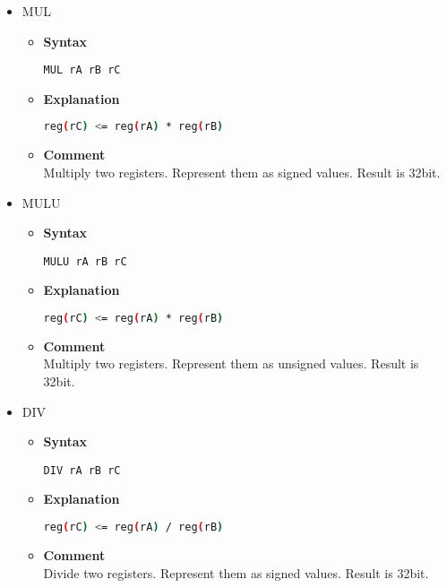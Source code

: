 \begin{itemize}
    \item MUL
    \begin{itemize}
        \item \textbf{Syntax}
        \begin{lstlisting}[language={[markII]Assembler}, frame=single]
    MUL rA rB rC
        \end{lstlisting}
        \item \textbf{Explanation}
        \begin{lstlisting}[language=bash, frame=single]
    reg(rC) <= reg(rA) * reg(rB)
        \end{lstlisting}
        \item \textbf{Comment} \\
        Multiply two registers. Represent them as signed values. Result is 32bit.
    \end{itemize}

    \item MULU
    \begin{itemize}
        \item \textbf{Syntax}
        \begin{lstlisting}[language={[markII]Assembler}, frame=single]
    MULU rA rB rC
        \end{lstlisting}
        \item \textbf{Explanation}
        \begin{lstlisting}[language=bash, frame=single]
    reg(rC) <= reg(rA) * reg(rB)
        \end{lstlisting}
        \item \textbf{Comment} \\
        Multiply two registers. Represent them as unsigned values. Result is 32bit.
    \end{itemize}

    \item DIV
    \begin{itemize}
        \item \textbf{Syntax}
        \begin{lstlisting}[language={[markII]Assembler}, frame=single]
    DIV rA rB rC
        \end{lstlisting}
        \item \textbf{Explanation}
        \begin{lstlisting}[language=bash, frame=single]
    reg(rC) <= reg(rA) / reg(rB)
        \end{lstlisting}
        \item \textbf{Comment} \\
        Divide two registers. Represent them as signed values. Result is 32bit.
    \end{itemize}


\end{itemize}
